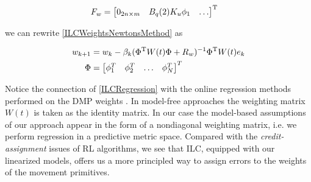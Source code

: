 \begin{equation}
\begin{aligned}
F_{w} &= \begin{bmatrix}
  0_{2n \times m} & B_{q}(2)K_{u}\phi_{1} & \ldots
 \end{bmatrix}^{\mathrm{T}}
\end{aligned}
\label{weightToOutputMatrixExpanded}
\end{equation}

we can rewrite \eqref{ILCWeightsNewtonsMethod} as

\begin{equation}
\begin{aligned}
w_{k+1} &= w_k - \beta_k(\Phi^{\mathrm{T}}W(t)\Phi + R_{w})^{-1}\Phi^{\mathrm{T}}W(t)e_k \\
\Phi &= \begin{bmatrix}
  \phi_1^{T} & \phi_2^{T} & \ldots & \phi_N^{T}
 \end{bmatrix}^{T}
\end{aligned}
\label{ILCRegression}
\end{equation}

Notice the connection of \eqref{ILCRegression} with the online regression methods performed on the DMP weights \cite{Ijspeert13}. In model-free approaches the weighting matrix $W(t)$ is taken as the identity matrix. In our case the model-based assumptions of our approach appear in the form of a nondiagonal weighting matrix, i.e. we perform regression in a predictive metric space. Compared with the \emph{credit-assignment} issues of RL algorithms, we see that ILC, equipped with our linearized models, offers us a more principled way to assign errors to the weights of the movement primitives.
